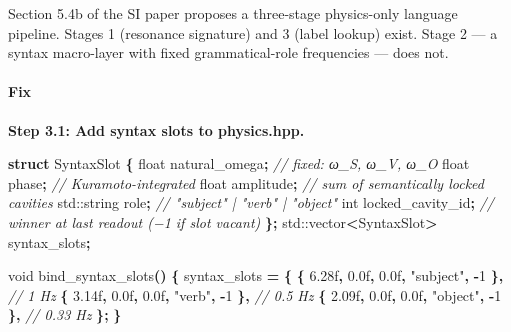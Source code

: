\documentclass[
  11pt,
  a4paper,
]{article}
\newenvironment{Shaded}{\begin{snugshade}}{\end{snugshade}}
\newcommand{\BuiltInTok}[1]{#1}
\newcommand{\CommentTok}[1]{\textcolor[rgb]{0.56,0.35,0.01}{\textit{#1}}}
\newcommand{\DataTypeTok}[1]{\textcolor[rgb]{0.13,0.29,0.53}{#1}}
\newcommand{\DecValTok}[1]{\textcolor[rgb]{0.00,0.00,0.81}{#1}}
\newcommand{\FloatTok}[1]{\textcolor[rgb]{0.00,0.00,0.81}{#1}}
\newcommand{\KeywordTok}[1]{\textcolor[rgb]{0.13,0.29,0.53}{\textbf{#1}}}
\newcommand{\NormalTok}[1]{#1}
\newcommand{\OperatorTok}[1]{\textcolor[rgb]{0.81,0.36,0.00}{\textbf{#1}}}
\newcommand{\StringTok}[1]{\textcolor[rgb]{0.31,0.60,0.02}{#1}}
\begin{document}
Section 5.4b of the SI paper proposes a three-stage physics-only
language pipeline. Stages 1 (resonance signature) and 3 (label lookup)
exist. Stage 2 --- a syntax macro-layer with fixed grammatical-role
frequencies --- does not.

\paragraph{Fix}\label{fix-2}

\textbf{Step 3.1: Add syntax slots to physics.hpp.}

\begin{Shaded}
\begin{Highlighting}[]
\KeywordTok{struct}\NormalTok{ SyntaxSlot }\OperatorTok{\{}
    \DataTypeTok{float}\NormalTok{ natural\_omega}\OperatorTok{;}      \CommentTok{// fixed: ω\_S, ω\_V, ω\_O}
    \DataTypeTok{float}\NormalTok{ phase}\OperatorTok{;}              \CommentTok{// Kuramoto{-}integrated}
    \DataTypeTok{float}\NormalTok{ amplitude}\OperatorTok{;}          \CommentTok{// sum of semantically locked cavities}
    \BuiltInTok{std::}\NormalTok{string role}\OperatorTok{;}         \CommentTok{// "subject" | "verb" | "object"}
    \DataTypeTok{int}\NormalTok{   locked\_cavity\_id}\OperatorTok{;}   \CommentTok{// winner at last readout (−1 if slot vacant)}
\OperatorTok{\};}
\BuiltInTok{std::}\NormalTok{vector}\OperatorTok{\textless{}}\NormalTok{SyntaxSlot}\OperatorTok{\textgreater{}}\NormalTok{ syntax\_slots}\OperatorTok{;}

\DataTypeTok{void}\NormalTok{ bind\_syntax\_slots}\OperatorTok{()} \OperatorTok{\{}
\NormalTok{    syntax\_slots }\OperatorTok{=} \OperatorTok{\{}
        \OperatorTok{\{} \FloatTok{6.28}\BuiltInTok{f}\OperatorTok{,} \FloatTok{0.0}\BuiltInTok{f}\OperatorTok{,} \FloatTok{0.0}\BuiltInTok{f}\OperatorTok{,} \StringTok{"subject"}\OperatorTok{,} \OperatorTok{{-}}\DecValTok{1} \OperatorTok{\},}  \CommentTok{// 1 Hz}
        \OperatorTok{\{} \FloatTok{3.14}\BuiltInTok{f}\OperatorTok{,} \FloatTok{0.0}\BuiltInTok{f}\OperatorTok{,} \FloatTok{0.0}\BuiltInTok{f}\OperatorTok{,} \StringTok{"verb"}\OperatorTok{,}    \OperatorTok{{-}}\DecValTok{1} \OperatorTok{\},}  \CommentTok{// 0.5 Hz}
        \OperatorTok{\{} \FloatTok{2.09}\BuiltInTok{f}\OperatorTok{,} \FloatTok{0.0}\BuiltInTok{f}\OperatorTok{,} \FloatTok{0.0}\BuiltInTok{f}\OperatorTok{,} \StringTok{"object"}\OperatorTok{,}  \OperatorTok{{-}}\DecValTok{1} \OperatorTok{\},}  \CommentTok{// 0.33 Hz}
    \OperatorTok{\};}
\OperatorTok{\}}
\end{Highlighting}
\end{Shaded}
\end{document}
